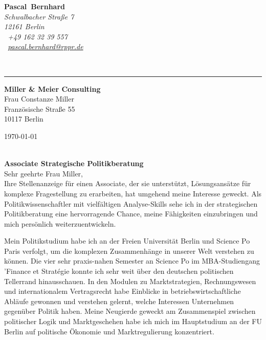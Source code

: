 \documentclass[11pt,a4paper]{article}
\def\firstname{Pascal}
\def\familyname{Bernhard}
\begin{document}
\sffamily   %
\hfill%
\begin{minipage}[t]{.6\textwidth}
	\raggedleft%
	{\bfseries {\color{firstnamecolor}\firstname}~{\color{familynamecolor}\familyname}}\\[.35ex]
	\small\itshape%
	Schwalbacher Straße 7\\
	12161 Berlin\\[.35ex]
	\Mobilefone~+49 162 32 39 557 \\
	\Letter~\href{mailto:pascal.bernhard@rppr.de}{pascal.bernhard@rppr.de}
\end{minipage}\\[0.5em]
%
{\color{firstnamecolor}\rule{\textwidth}{.25ex}}
%
\begin{minipage}[t]{.4\textwidth}
	\raggedright%
	\vspace*{1em}
	\textbf{Miller \& Meier Consulting} \\
	Frau Constanze Miller \\[.35ex]
	\small%
	Französische Straße 55\\
	10117 Berlin
\end{minipage}
%
\hfill
%
\begin{minipage}[t]{.4\textwidth}
	\raggedleft %
	\today
\end{minipage}\\[1em]


{\bfseries \color{familynamecolor}Associate Strategische Politikberatung}\\[0.75em]

Sehr geehrte Frau Miller,\\[0.5em]
%
Ihre Stellenanzeige für einen Associate, der sie unterstützt, Lösungsansätze für komplexe Fragestellung zu erarbeiten, hat umgehend meine Interesse geweckt. Als Politikwissenschaftler mit vielfältigen Analyse-Skills sehe ich in der strategischen Politikberatung eine hervorragende Chance, meine Fähigkeiten einzubringen und mich persönlich weiterzuentwickeln.

Mein Politikstudium habe ich an der Freien Universität Berlin und Science Po Paris verfolgt, um die komplexen Zusammenhänge in unserer Welt verstehen zu können. Die vier sehr praxis-nahen Semester an Science Po im MBA-Studiengang 'Finance et Strat\'{e}gie konnte ich sehr weit über den deutschen politischen Tellerrand hinausschauen. In den Modulen zu Marktstrategien, Rechnungswesen und internationalem Vertragsrecht habe Einblicke in betriebswirtschaftliche Abläufe gewonnen und verstehen gelernt, welche Interessen Unternehmen gegenüber Politik haben. Meine Neugierde geweckt am Zusammenspiel zwischen politischer Logik und Marktgeschehen habe ich mich im Hauptstudium an der FU Berlin auf politische Ökonomie und Marktregulierung konzentriert.
\end{document}
